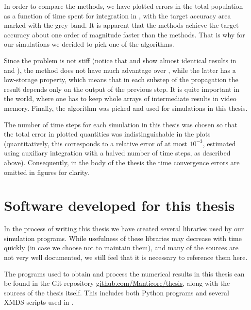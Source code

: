 In order to compare the methods, we have plotted errors in the total population as a function of time spent for integration in , with the target accuracy area marked with the grey band.
It is apparent that the  methods achieve the target accuracy about one order of magnitude faster than the  methods.
That is why for our simulations we decided to pick one of the  algorithms.

Since the problem is not stiff (notice that  and  show almost identical results in  and ), the  method does not have much advantage over , while the latter has a low-storage property, which means that in each substep of the  propagation the result depends only on the output of the previous step.
It is quite important in the  world, where one has to keep whole arrays of intermediate results in video memory.
Finally, the  algorithm was picked and used for simulations in this thesis.

The number of time steps for each simulation in this thesis was chosen so that the total error in plotted quantities was indistinguishable in the plots (quantitatively, this corresponds to a relative error of at most $10^{-3}$, estimated using auxiliary integration with a halved number of time steps, as described above).
Consequently, in the body of the thesis the time convergence errors are omitted in figures for clarity.


\section{Software developed for this thesis}

In the process of writing this thesis we have created several libraries used by our simulation programs.
While usefulness of these libraries may decrease with time quickly (in case we choose not to maintain them), and many of the sources are not very well documented, we still feel that it is necessary to reference them here.

The programs used to obtain and process the numerical results in this thesis can be found in the Git repository \href{http://github.com/Manticore/thesis}{github.com/Manticore/thesis}, along with the sources of the thesis itself.
This includes both Python programs and several XMDS scripts used in .

